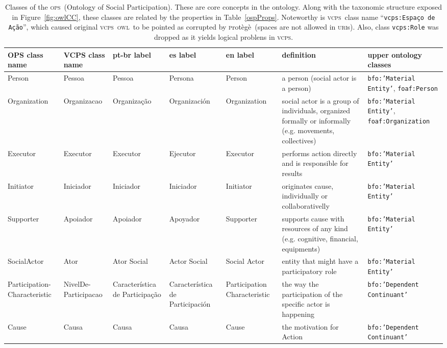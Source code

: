 \documentclass[10pt,letterpaper]{article}
\newcommand{\ops}{\textsc{ops}}
\newcommand{\vcps}{\textsc{vcps}}
\newcommand{\owl}{\textsc{owl}}
\newcommand{\uri}{\textsc{uri}}
\newcommand{\protege}{\textsc{p}rot\`eg\`e}
\begin{document}
\begin{table}[!h]
    \footnotesize
  \centering
  \caption{Classes of the \ops\ (Ontology of Social Participation). These are core concepts in the ontology. Along with the taxonomic structure exposed in Figure~\ref{fig:owlCC}, these classes are related by the properties in Table~\ref{ospProps}. Noteworthy is \vcps\ class name ``{\tt vcps:Espa\c{c}o de A\c{c}\~ao}'', which caused original \vcps\ \owl\ to be pointed as corrupted by \protege\ (spaces are not allowed in \uri s). Also, class {\tt vcps:Role} was dropped as it yields logical problens in \vcps.}
  \begin{tabular}{|p{1.8cm}|p{1.6cm}||p{2.2cm}|p{2.2cm}|p{1.8cm}||p{4cm}||p{3cm}|}\hline
      {\bf OPS class name} & {\bf VCPS class name} & {\bf pt-br label} & {\bf es label} & {\bf en label} & {\bf definition} & {\bf upper ontology classes} \\\hline\hline
      Person & Pessoa & Pessoa & Persona & Person & a person (social actor is a person) & {\tt bfo:'Material Entity'}, {\tt foaf:Person} \\ \hline
      Organization & Organizacao & Organiza\c{c}\~ao & Organizaci\'on & Organization & social actor is a group of individuals, organized formally or informally (e.g. movements, collectives) & {\tt bfo:'Material Entity'}, {\tt foaf:Organization} \\ \hline \hline
Executor & Executor & Executor & Ejecutor & Executor & performs action directly and is responsible for results & {\tt bfo:'Material Entity'} \\ \hline
Initiator & Iniciador & Iniciador & Iniciador & Initiator & originates cause, individually or collaborativelly & {\tt bfo:'Material Entity'} \\ \hline
      Supporter & Apoiador & Apoiador & Apoyador & Supporter & supports cause with resources of any kind (e.g. cognitive, financial, equipments) & {\tt bfo:'Material Entity'} \\ \hline
SocialActor & Ator & Ator Social & Actor Social & Social Actor & entity that might have a participatory role & {\tt bfo:'Material Entity'} \\ \hline \hline
Participation-Characteristic & NivelDe-Participacao & Caracter\'istica de Participa\c{c}\~ao & Caracter\'istica de Participaci\'on & Participation Characteristic & the way the participation of the specific actor is happening & {\tt bfo:'Dependent Continuant'} \\\hline
Cause & Causa & Causa & Causa &  Cause & the motivation for Action & {\tt bfo:'Dependent Continuant'} \\\hline

\end{tabular}
\end{table}
\end{document}
